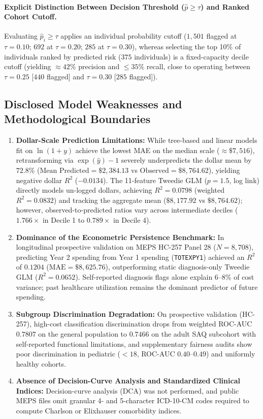 \documentclass[runningheads]{llncs}
\begin{document}
\paragraph{Explicit Distinction Between Decision Threshold ($\hat{p} \ge \tau$) and Ranked Cohort Cutoff.}
Evaluating $\hat{p}_i \ge \tau$ applies an individual probability cutoff ($1,501$ flagged at $\tau=0.10$; $692$ at $\tau=0.20$; $285$ at $\tau=0.30$), whereas selecting the top 10\% of individuals ranked by predicted risk ($375$ individuals) is a fixed-capacity decile cutoff (yielding $\approx 42\%$ precision and $\le 35\%$ recall, close to operating between $\tau = 0.25$ [$440$ flagged] and $\tau = 0.30$ [$285$ flagged]).

\subsection{Disclosed Model Weaknesses and Methodological Boundaries}
\begin{enumerate}
    \item \textbf{Dollar-Scale Prediction Limitations:} While tree-based and linear models fit on $\ln(1+y)$ achieve the lowest MAE on the median scale ($\approx \$7,516$), retransforming via $\exp(\hat{y})-1$ severely underpredicts the dollar mean by $72.8\%$ ($\text{Mean Predicted} = \$2,384.13$ vs $\text{Observed} = \$8,764.62$), yielding negative dollar $R^2$ ($-0.0134$). The 11-feature Tweedie GLM ($p=1.5$, log link) directly models un-logged dollars, achieving $R^2 = 0.0798$ (weighted $R^2 = 0.0832$) and tracking the aggregate mean ($\$8,177.92$ vs $\$8,764.62$); however, observed-to-predicted ratios vary across intermediate deciles ($1.766\times$ in Decile 1 to $0.789\times$ in Decile 4).
    \item \textbf{Dominance of the Econometric Persistence Benchmark:} In longitudinal prospective validation on MEPS HC-257 Panel 28 ($N=8,708$), predicting Year 2 spending from Year 1 spending (\texttt{TOTEXPY1}) achieved an $R^2$ of \textbf{$0.1204$} ($\text{MAE} = \$8,625.76$), outperforming static diagnosis-only Tweedie GLM ($R^2 = 0.0652$). Self-reported diagnosis flags alone explain 6--8\% of cost variance; past healthcare utilization remains the dominant predictor of future spending.
    \item \textbf{Subgroup Discrimination Degradation:} On prospective validation (HC-257), high-cost classification discrimination drops from weighted ROC-AUC $0.7807$ on the general population to \textbf{$0.7466$} on the adult SAQ subcohort with self-reported functional limitations, and supplementary fairness audits show poor discrimination in pediatric ($<18$, ROC-AUC $0.40$--$0.49$) and uniformly healthy cohorts.
    \item \textbf{Absence of Decision-Curve Analysis and Standardized Clinical Indices:} Decision-curve analysis (DCA) was not performed, and public MEPS files omit granular 4- and 5-character ICD-10-CM codes required to compute Charlson or Elixhauser comorbidity indices.
\end{enumerate}
\end{document}
